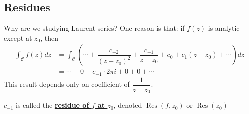 \documentclass[12pt,titlepage]{article}
\DeclareMathOperator\Res{Res}
\begin{document}
\subsection{Residues}
Why are we studying Laurent series? One reason is that: if $f(z)$ is analytic except at $z_0$, then \begin{align*}
	\int_{\mathcal{C}}f(z) dz &= \int_{\mathcal{C}} \left(\cdots + \dfrac{c_{-2}}{(z-z_0)^2}+ \dfrac{c_{-1}}{z-z_0}+c_0 + c_1(z-z_0) + \cdots\right) dz\\
	&= \cdots + 0 + c_{-1}\cdot 2\pi i + 0 + 0 + \cdots
\end{align*}
This result depends only on coefficient of $\dfrac{1}{z-z_0}$. 

$c_{-1}$ is called the \textbf{\underline{residue of $f$ at $z_0$}}, denoted $\Res(f,z_0)$ or $\Res(z_0)$
\end{document}
